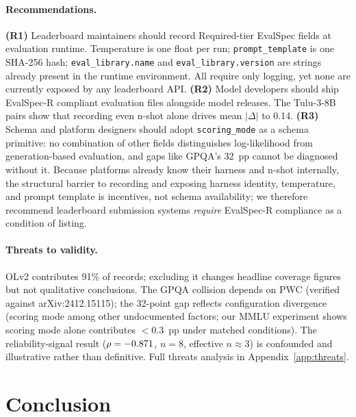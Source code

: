 \documentclass[11pt]{article}
\begin{document}
\paragraph{Recommendations.}
\textbf{(R1)} Leaderboard maintainers should record Required-tier
EvalSpec fields at evaluation runtime. Temperature is one float
per run; \texttt{prompt\_template} is one SHA-256 hash;
\texttt{eval\_library.name} and \texttt{eval\_library.version}
are strings already present in the runtime environment. All
require only logging, yet none are currently exposed by any
leaderboard API. \textbf{(R2)} Model developers should ship EvalSpec-R
compliant evaluation files alongside model releases. The
Tulu-3-8B pairs show that recording even n-shot alone
drives mean $|\Delta|$ to 0.14. \textbf{(R3)} Schema and platform
designers should adopt \texttt{scoring\_mode} as a schema
primitive: no combination of other fields distinguishes
log-likelihood from generation-based evaluation, and gaps like
GPQA's 32~pp cannot be diagnosed without it. Because platforms already know
their harness and n-shot internally, the structural barrier to
recording and exposing harness identity,
temperature, and prompt template is incentives, not schema
availability; we therefore recommend leaderboard submission
systems \emph{require} EvalSpec-R compliance as a condition of
listing.

\paragraph{Threats to validity.}\label{sec:threats}
OLv2 contributes 91\% of records; excluding it changes headline
coverage figures but not qualitative conclusions. The GPQA
collision depends on PWC (verified against arXiv:2412.15115); the
32-point gap reflects configuration divergence (scoring mode among
other undocumented factors; our MMLU experiment shows scoring mode
alone contributes $<$0.3~pp under matched conditions). The
reliability-signal result ($\rho = -0.871{}$, $n = 8$, effective
$n \approx 3$) is confounded and illustrative rather than
definitive. Full threats analysis in Appendix~\ref{app:threats}.

\section{Conclusion}\label{sec:conclusion}
\end{document}
